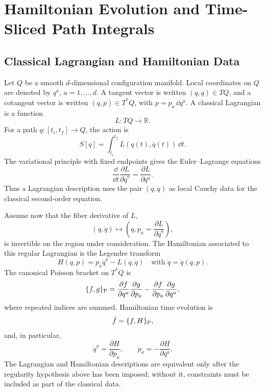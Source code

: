 \chapter{Hamiltonian Evolution and Time-Sliced Path Integrals}
\label{ch:hamiltonian-evolution-time-sliced-path-integrals}

\section{Classical Lagrangian and Hamiltonian Data}

Let \(Q\) be a smooth \(d\)-dimensional configuration manifold.  Local
coordinates on \(Q\) are denoted by \(q^a\), \(a=1,\ldots,d\).  A tangent
vector is written \((q,\dot q)\in TQ\), and a cotangent vector is written
\((q,p)\in T^*Q\), with \(p=p_a\,\dd q^a\).  A classical Lagrangian is a
function
\[
  L:TQ\to\mathbb R.
\]
For a path \(q:[t_i,t_f]\to Q\), the action is
\[
  S[q]=\int_{t_i}^{t_f}L(q(t),\dot q(t))\,\dd t .
\]
The variational principle with fixed endpoints gives the Euler--Lagrange
equations
\[
  \frac{\dd}{\dd t}\frac{\partial L}{\partial \dot q^a}
  =
  \frac{\partial L}{\partial q^a}.
\]
Thus a Lagrangian description uses the pair \((q,\dot q)\) as local Cauchy
data for the classical second-order equation.

Assume now that the fiber derivative of \(L\),
\[
  (q,\dot q)\longmapsto
  \left(q,p_a=\frac{\partial L}{\partial\dot q^a}\right),
\]
is invertible on the region under consideration.  The Hamiltonian associated
to this regular Lagrangian is the Legendre transform
\[
  H(q,p)=p_a\dot q^a-L(q,\dot q)
  \quad
  \text{with }\dot q=\dot q(q,p).
\]
The canonical Poisson bracket on \(T^*Q\) is
\[
  \{f,g\}_{\rm P}
  =
  \frac{\partial f}{\partial q^a}\frac{\partial g}{\partial p_a}
  -
  \frac{\partial f}{\partial p_a}\frac{\partial g}{\partial q^a},
\]
where repeated indices are summed.  Hamiltonian time evolution is
\[
  \dot f=\{f,H\}_{\rm P},
\]
and, in particular,
\[
  \dot q^a=\frac{\partial H}{\partial p_a},
  \qquad
  \dot p_a=-\frac{\partial H}{\partial q^a}.
\]
The Lagrangian and Hamiltonian descriptions are equivalent only after the
regularity hypothesis above has been imposed; without it, constraints must be
included as part of the classical data.

